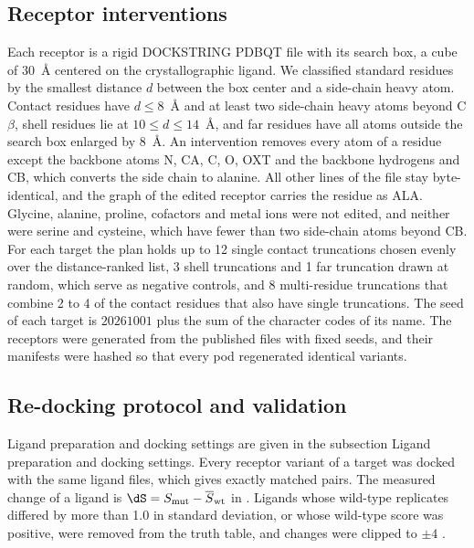 \subsection{Receptor interventions}

Each receptor is a rigid DOCKSTRING PDBQT file with its search box, a cube of 30~\AA{} centered on the crystallographic ligand. We classified standard residues by the smallest distance $d$ between the box center and a side-chain heavy atom. Contact residues have $d \le 8$~\AA{} and at least two side-chain heavy atoms beyond C$\beta$, shell residues lie at $10 \le d \le 14$~\AA{}, and far residues have all atoms outside the search box enlarged by 8~\AA{}. An intervention removes every atom of a residue except the backbone atoms N, CA, C, O, OXT and the backbone hydrogens and CB, which converts the side chain to alanine. All other lines of the file stay byte-identical, and the graph of the edited receptor carries the residue as ALA. Glycine, alanine, proline, cofactors and metal ions were not edited, and neither were serine and cysteine, which have fewer than two side-chain atoms beyond CB. For each target the plan holds up to 12 single contact truncations chosen evenly over the distance-ranked list, 3 shell truncations and 1 far truncation drawn at random, which serve as negative controls, and 8 multi-residue truncations that combine 2 to 4 of the contact residues that also have single truncations. The seed of each target is $20261001$ plus the sum of the character codes of its name. The receptors were generated from the published files with fixed seeds, and their manifests were hashed so that every pod regenerated identical variants.

\subsection{Re-docking protocol and validation}

Ligand preparation and docking settings are given in the subsection Ligand preparation and docking settings. Every receptor variant of a target was docked with the same ligand files, which gives exactly matched pairs. The measured change of a ligand is $\dS = S_\mathrm{mut} - \overline{S}_\mathrm{wt}$ in \kcal{}. Ligands whose wild-type replicates differed by more than 1.0 \kcal{} in standard deviation, or whose wild-type score was positive, were removed from the truth table, and changes were clipped to $\pm 4$ \kcal{}.

